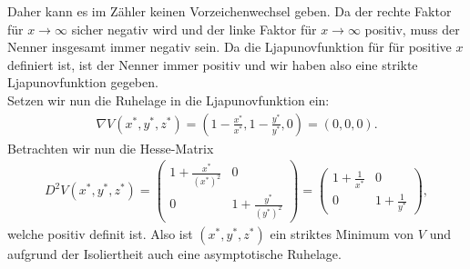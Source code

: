 \begin{solution}
Daher kann es im Zähler keinen Vorzeichenwechsel geben. Da der rechte Faktor für $x \to \infty$ sicher negativ wird
und der linke Faktor für $x \to \infty$ positiv, muss der Nenner insgesamt immer negativ sein.
Da die Ljapunovfunktion für für positive $x$ definiert ist, ist der Nenner immer positiv
und wir haben also eine strikte Ljapunovfunktion gegeben. \\
Setzen wir nun die Ruhelage in die Ljapunovfunktion ein:
\begin{align*}
  \nabla V(x^*,y^*,z^*) = (1 - \frac{x^*}{x^*}, 1 - \frac{y^*}{y^*}, 0) = (0,0,0).
\end{align*}
Betrachten wir nun die Hesse-Matrix
\begin{align*}
  D^2 V(x^*,y^*,z^*) = \begin{pmatrix}
    1 + \frac{x^*}{(x^*)^2} & 0 \\
    0 & 1 + \frac{y^*}{(y^*)^2}
  \end{pmatrix}
  = \begin{pmatrix}
    1 + \frac{1}{x^*} & 0 \\
    0 & 1 + \frac{1}{y^*}
  \end{pmatrix},
\end{align*}
welche positiv definit ist. Also ist $(x^*,y^*,z^*)$ ein striktes Minimum von $V$
und aufgrund der Isoliertheit auch eine asymptotische Ruhelage.
\end{solution}
